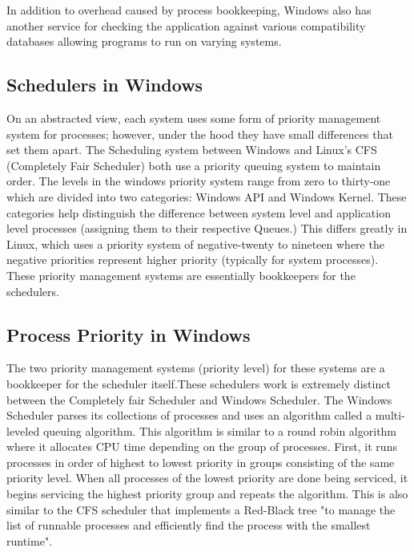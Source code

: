 In addition to overhead caused by process bookkeeping, Windows also has another service for checking the application against various compatibility databases allowing programs to run on varying systems\cite{AboutPro74:online}.
\subsection{Schedulers in Windows}
On an abstracted view, each system uses some form of priority management system for processes; however, under the hood they have small differences that set them apart. The Scheduling system between Windows and Linux's CFS (Completely Fair Scheduler) both use a priority queuing system to maintain order. The levels in the windows priority system range from zero to thirty-one which are divided into two categories: Windows API and Windows Kernel\cite{windowsbookpt1}. These categories help distinguish the difference between system level and application level processes (assigning them to their respective Queues.) This differs greatly in Linux, which uses a priority system of negative-twenty to nineteen \cite{Linux_book} where the negative priorities represent higher priority (typically for system processes). These priority management systems are essentially bookkeepers for the schedulers.
\subsection{Process Priority in Windows}
The two priority management systems (priority level) for these systems are a bookkeeper for the scheduler itself.These schedulers work is extremely distinct between the Completely fair Scheduler and Windows Scheduler. The Windows Scheduler parses its collections of processes and uses an algorithm called a multi-leveled queuing algorithm\cite{Scheduli20:online}. This algorithm is similar to a round robin algorithm where it allocates CPU time depending on the group of processes. First, it runs processes in order of highest to lowest priority in groups consisting of the same priority level. When all processes of the lowest priority are done being serviced, it begins servicing the highest priority group and repeats the algorithm. This  is also similar to the CFS scheduler that implements a Red-Black tree "to manage the list of runnable processes and efficiently find the process with the smallest runtime"\cite{Linux_book}.

